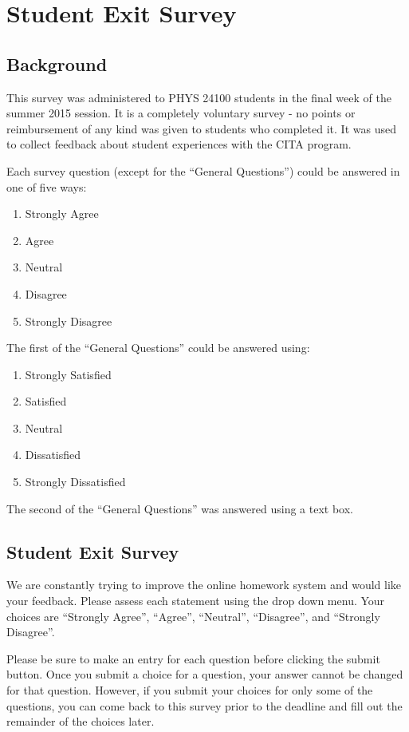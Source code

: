 \chapter[Student Exit Survey]{Student Exit Survey}

\section{Background}

This survey was administered to PHYS 24100 students in the final week of the summer 2015 session. It is a completely voluntary survey - no points or reimbursement of any kind was given to students who completed it. It was used to collect feedback about student experiences with the CITA program.

Each survey question (except for the ``General Questions'') could be answered in one of five ways:

\begin{enumerate}
	\item Strongly Agree
	\item Agree
	\item Neutral
	\item Disagree
	\item Strongly Disagree
\end{enumerate}

The first of the ``General Questions'' could be answered using:

\begin{enumerate}
	\item Strongly Satisfied
	\item Satisfied
	\item Neutral
	\item Dissatisfied
	\item Strongly Dissatisfied
\end{enumerate}

The second of the ``General Questions'' was answered using a text box.

\section{Student Exit Survey}

We are constantly trying to improve the online homework system and would like your feedback. Please assess each statement using the drop down menu. Your choices are ``Strongly Agree'', ``Agree'', ``Neutral'', ``Disagree'', and ``Strongly Disagree''.

Please be sure to make an entry for each question before clicking the submit button. Once you submit a choice for a question, your answer cannot be changed for that question. However, if you submit your choices for only some of the questions, you can come back to this survey prior to the deadline and fill out the remainder of the choices later.

